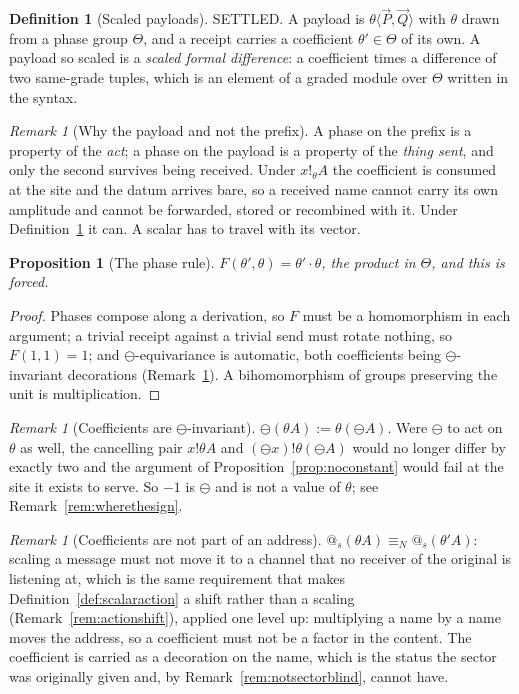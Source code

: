 \documentclass[11pt]{article}
\makeatletter
\newtheorem{proposition}[theorem]{Proposition}
\theoremstyle{definition}
\newtheorem{definition}[theorem]{Definition}
\theoremstyle{remark}
\newtheorem{remark}[theorem]{Remark}
\newcommand{\quo}[1]{\ensuremath{@_{#1}}}
\newcommand{\dip}[2]{\ensuremath{\langle #1 , #2 \rangle}}
\newcommand{\negop}{\ensuremath{\ominus}}
\newcommand{\nameq}{\ensuremath{\equiv_{N}}}
\makeatother
\begin{document}
\begin{definition}[Scaled payloads]
\label{def:scaled}
SETTLED. A payload is $\theta\dip{\vec{P}}{\vec{Q}}$ with $\theta$ drawn from a
phase group $\Theta$, and a receipt carries a coefficient $\theta' \in \Theta$
of its own. A payload so scaled is a \emph{scaled formal difference}: a
coefficient times a difference of two same-grade tuples, which is an element of
a graded module over $\Theta$ written in the syntax.
\end{definition}

\begin{remark}[Why the payload and not the prefix]
\label{rem:payloadnotprefix}
A phase on the prefix is a property of the \emph{act}; a phase on the payload is
a property of the \emph{thing sent}, and only the second survives being
received. Under $x!_{\theta}A$ the coefficient is consumed at the site and the
datum arrives bare, so a received name cannot carry its own amplitude and cannot
be forwarded, stored or recombined with it. Under
Definition~\ref{def:scaled} it can. A scalar has to travel with its vector.
\end{remark}

\begin{proposition}[The phase rule]
\label{prop:F}
$F(\theta',\theta) = \theta' \cdot \theta$, the product in $\Theta$, and this is
forced.
\end{proposition}

\begin{proof}
Phases compose along a derivation, so $F$ must be a homomorphism in each
argument; a trivial receipt against a trivial send must rotate nothing, so
$F(1,1)=1$; and $\negop$-equivariance is automatic, both coefficients being
$\negop$-invariant decorations (Remark~\ref{rem:thetainvariant}). A
bihomomorphism of groups preserving the unit is multiplication.
\end{proof}

\begin{remark}[Coefficients are $\negop$-invariant]
\label{rem:thetainvariant}
$\negop(\theta A) := \theta(\negop A)$. Were $\negop$ to act on $\theta$ as
well, the cancelling pair $x!\theta A$ and $(\negop x)!\theta(\negop A)$ would
no longer differ by exactly two and the argument of
Proposition~\ref{prop:noconstant} would fail at the site it exists to serve. So
$-1$ is $\negop$ and is not a value of $\theta$; see
Remark~\ref{rem:wherethesign}.
\end{remark}

\begin{remark}[Coefficients are not part of an address]
\label{rem:notaddress}
$\quo{s}(\theta A) \nameq \quo{s}(\theta' A)$: scaling a message must not move
it to a channel that no receiver of the original is listening at, which is the
same requirement that makes Definition~\ref{def:scalaraction} a shift rather
than a scaling (Remark~\ref{rem:actionshift}), applied one level up: multiplying
a name by a name moves the address, so a coefficient must not be a factor in the
content. The coefficient is
carried as a decoration on the name, which is the status the sector was
originally given and, by Remark~\ref{rem:notsectorblind}, cannot have.
\end{remark}
\end{document}

